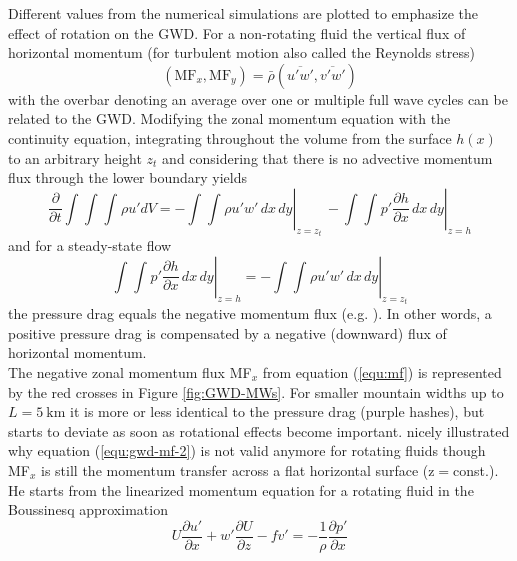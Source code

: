 Different values from the numerical simulations are plotted to emphasize the effect of rotation on the GWD. For a non-rotating fluid the vertical flux of horizontal momentum (for turbulent motion also called the Reynolds stress)
\begin{equation}
    (\mathrm{MF}_x, \mathrm{MF}_y) = \bar{\rho}  (\overbar{u'w'},\overbar{v'w'})
    \label{equ:mf}
\end{equation}
with the overbar denoting an average over one or multiple full wave cycles can be related to the GWD. Modifying the zonal momentum equation with the continuity equation, integrating throughout the volume from the surface $h(x)$ to an arbitrary height $z_t$ and considering that there is no advective momentum flux through the lower boundary yields
\begin{equation}
    \frac{\partial}{\partial t}\int_{}^{} \int_{}^{} \int_{}^{} \rho u' dV = - \left.\int_{}^{} \int_{}^{} \rho u'w' \, dx \, dy \right\vert_{z=z_t}  \,
    - \left.\int_{}^{} \int_{}^{} p' \frac{\partial h}{\partial x} \, dx \, dy \right\vert_{z=h}
    \label{equ:gwd-mf}
\end{equation}
and for a steady-state flow
\begin{equation}
    \left.\int_{}^{} \int_{}^{} p' \frac{\partial h}{\partial x} \, dx \, dy \right\vert_{z=h} =  -\left.\int_{}^{}  \int_{}^{} \rho u'w' \, dx \, dy \right\vert_{z=z_t}
    \label{equ:gwd-mf-2}
\end{equation}
the pressure drag equals the negative momentum flux (e.g. \cite[]{durran_lee_2003}). In other words, a positive pressure drag is compensated by a negative (downward) flux of horizontal momentum. \\
The negative zonal momentum flux MF$_x$ from equation (\ref{equ:mf}) is represented by the red crosses in Figure \ref{fig:GWD-MWs}. For smaller mountain widths up to $L=\SI{5}{\kilo\meter}$ it is more or less identical to the pressure drag (purple hashes), but starts to deviate as soon as rotational effects become important. \textcite[]{bretherton_momentum_1969} nicely illustrated why equation (\ref{equ:gwd-mf-2}) is not valid anymore for rotating fluids though MF$_x$ is still the momentum transfer across a flat horizontal surface (z$=$const.). He starts from the linearized momentum equation for a rotating fluid in the Boussinesq approximation
\begin{equation}
    U \frac{\partial u'}{\partial x} + w' \frac{\partial U}{\partial z} - f v' = -\frac{1}{\rho} \frac{\partial p'}{\partial x}
    \label{equ:momEqu-rotating}
\end{equation}
